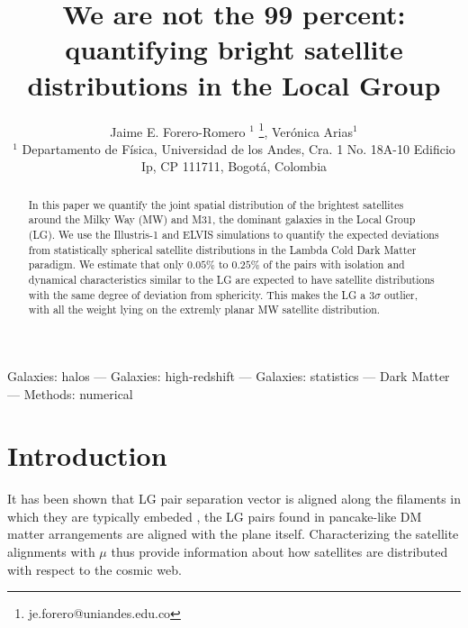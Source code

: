 \documentclass[a4paper,fleqn,usenatbib]{mnras}
\begin{document}
\title[LG as an outlier]{We are not the 99 percent: quantifying
  bright satellite distributions in the Local Group}
\author[J.E. Forero-Romero \& V. Arias]
{Jaime E. Forero-Romero $^{1}$ \thanks{je.forero@uniandes.edu.co},
Ver\'onica Arias$^1$\\
$^1$ Departamento de F\'isica, Universidad de los Andes, Cra. 1
  No. 18A-10 Edificio Ip, CP 111711, Bogot\'a, Colombia \\
}

\maketitle

\begin{abstract}
In this paper we quantify the joint spatial distribution of the
brightest satellites around the Milky Way (MW) and M31, the dominant
galaxies in the Local Group (LG).
We use the Illustris-1 and ELVIS simulations to quantify the
expected deviations from statistically spherical satellite
distributions in the Lambda Cold Dark Matter paradigm. 
We estimate that only $0.05\%$ to $0.25\%$ of the pairs with isolation
and dynamical characteristics similar to the LG are expected to have
satellite distributions with the same degree of deviation from
sphericity.
This makes the LG a $3\sigma$ outlier, with all the weight lying on
the extremly planar MW satellite distribution.
\end{abstract}

\begin{keywords}Galaxies: halos --- Galaxies: high-redshift --- Galaxies: statistics
--- Dark Matter --- Methods: numerical 
\end{keywords}

\section{Introduction}

 
It has been shown that LG pair separation vector is aligned along the
filaments in  which they are typically embeded
\cite{2015ApJ...799...45F}, the LG pairs found in pancake-like DM
matter arrangements are aligned with the plane itself. 
Characterizing the satellite alignments with $\mu$ thus provide
information about how satellites are distributed with respect to the
cosmic web. 
\end{document}
